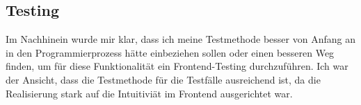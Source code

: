 \subsection{Testing}
Im Nachhinein wurde mir klar, dass ich meine Testmethode besser von Anfang an in den Programmierprozess hätte einbeziehen sollen oder einen besseren Weg finden, um für diese Funktionalität ein Frontend-Testing durchzuführen.
Ich war der Ansicht, dass die Testmethode für die Testfälle ausreichend ist, da die Realisierung stark auf die Intuitiviät im Frontend ausgerichtet war.